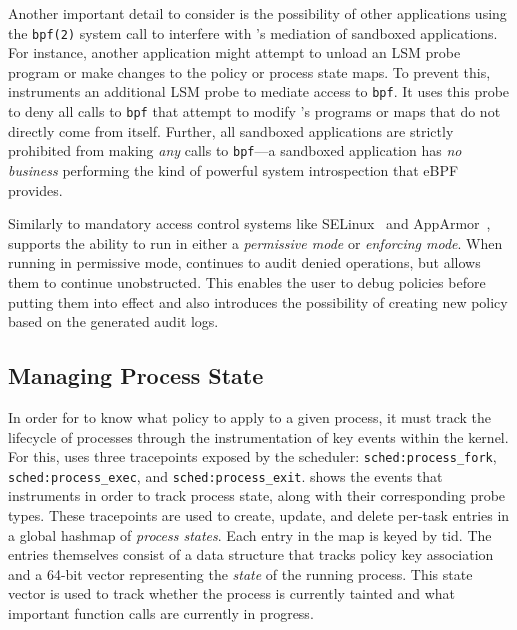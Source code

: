 Another important detail to consider is the possibility of other applications using the
\texttt{bpf(2)} system call to interfere with \bpfbox{}'s mediation of sandboxed
applications. For instance, another application might attempt to unload an LSM probe
program or make changes to the policy or process state maps. To prevent this, \bpfbox{}
instruments an additional LSM probe to mediate access to \texttt{bpf}. It uses this probe
to deny all calls to \texttt{bpf} that attempt to modify \bpfbox{}'s programs or maps that
do not directly come from \bpfbox{} itself. Further, all sandboxed applications are
strictly prohibited from making \textit{any} calls to \texttt{bpf}---a sandboxed
application has \textit{no business} performing the kind of powerful system introspection
that eBPF provides.

Similarly to mandatory access control systems like SELinux~\cite{smalley2001_selinux} and
AppArmor~\cite{cowan2000_apparmor}, \bpfbox{} supports the ability to run in either a
\textit{permissive mode} or \textit{enforcing mode}.  When running in permissive mode,
\bpfbox{} continues to audit denied operations, but allows them to continue unobstructed.
This enables the user to debug policies before putting them into effect and also
introduces the possibility of creating new policy based on the generated audit logs.



\subsection{Managing Process State}%
\label{ss:bpfbox-state}

In order for \bpfbox{} to know what policy to apply to a given process, it must track the
lifecycle of processes through the instrumentation of key events within the kernel. For
this, \bpfbox{} uses three tracepoints exposed by the scheduler:
\texttt{sched:process\_fork}, \texttt{sched:process\_exec}, and
\texttt{sched:process\_exit}.  shows the events that \bpfbox{}
instruments in order to track process state, along with their corresponding probe types.
These tracepoints are used to create, update, and delete per-task entries in a global
hashmap of \textit{process states}.  Each entry in the map is keyed by \gls{tid}. The
entries themselves consist of a data structure that tracks policy key association and
a 64-bit vector representing the \textit{state} of the running process.  This state vector
is used to track whether the process is currently tainted and what important function
calls are currently in progress.

